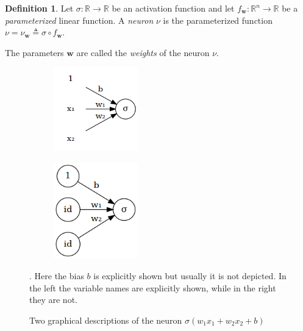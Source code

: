\documentclass[11pt, a4paper]{report}
\theoremstyle{plain}
\theoremstyle{definition}
\newtheorem{mydef}{Definition}[chapter]
\theoremstyle{remark}
\newcommand{\R}{\mathbb{R}}
\newcommand{\w}{\mathbf{w}}
\begin{document}
\begin{mydef}
\label{def:neuron}
Let $\sigma : \R \to \R$ be an activation function and let $f_{\w} : \R^n \to \R$
be a \emph{parameterized} linear function. A \emph{neuron} $\nu$ is the
parameterized function 
$\nu =  \nu_{\w} \triangleq \sigma \circ
f_{\w}$.

The parameters $\w$ are called the \emph{weights} of the neuron $\nu$.
\end{mydef}


\begin{figure}[h]
\centering
\begin{subfigure}[b]{0.45\textwidth}
\includegraphics[width=0.4\textwidth]{./plots/neuron.gv.png}
\end{subfigure}
\begin{subfigure}[b]{0.45\textwidth}
\includegraphics[width=0.4\textwidth]{./plots/neuron.2.gv.png}
\end{subfigure}
\caption{Two graphical descriptions of the neuron
$\sigma(w_1x_1 + w_2x_2 + b)$}. Here the bias $b$ is explicitly shown
but usually it is not depicted. In the left the variable names are explicitly
shown, while in the right they are not.
\label{fig:neuron2}
\end{figure}
\end{document}
